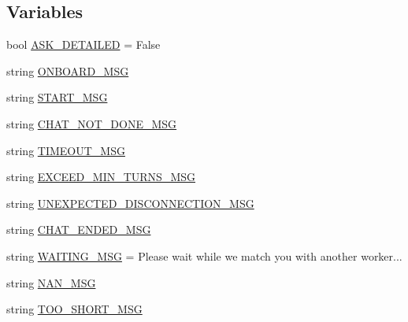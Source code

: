 \subsection*{Variables}
\begin{DoxyCompactItemize}
\item 
bool \hyperlink{namespaceprojects_1_1controllable__dialogue_1_1mturk_1_1worlds_ae8e21c5fc7585f72997c46673774e560}{A\+S\+K\+\_\+\+D\+E\+T\+A\+I\+L\+ED} = False
\item 
string \hyperlink{namespaceprojects_1_1controllable__dialogue_1_1mturk_1_1worlds_add971d800febe4ed1c8e6519f47b0344}{O\+N\+B\+O\+A\+R\+D\+\_\+\+M\+SG}
\item 
string \hyperlink{namespaceprojects_1_1controllable__dialogue_1_1mturk_1_1worlds_a8b6f4cadfbf4ded8be056b35fc39bfea}{S\+T\+A\+R\+T\+\_\+\+M\+SG}
\item 
string \hyperlink{namespaceprojects_1_1controllable__dialogue_1_1mturk_1_1worlds_a309caa0362b3ad2f21726ee5ac4695cf}{C\+H\+A\+T\+\_\+\+N\+O\+T\+\_\+\+D\+O\+N\+E\+\_\+\+M\+SG}
\item 
string \hyperlink{namespaceprojects_1_1controllable__dialogue_1_1mturk_1_1worlds_a0dbdd5f376e76791bb0860e586d1a198}{T\+I\+M\+E\+O\+U\+T\+\_\+\+M\+SG}
\item 
string \hyperlink{namespaceprojects_1_1controllable__dialogue_1_1mturk_1_1worlds_a0e771fa893e3b64e53f744b10c64a7b9}{E\+X\+C\+E\+E\+D\+\_\+\+M\+I\+N\+\_\+\+T\+U\+R\+N\+S\+\_\+\+M\+SG}
\item 
string \hyperlink{namespaceprojects_1_1controllable__dialogue_1_1mturk_1_1worlds_aff45fc3f19f338fe6b2c9cb99c6da1e8}{U\+N\+E\+X\+P\+E\+C\+T\+E\+D\+\_\+\+D\+I\+S\+C\+O\+N\+N\+E\+C\+T\+I\+O\+N\+\_\+\+M\+SG}
\item 
string \hyperlink{namespaceprojects_1_1controllable__dialogue_1_1mturk_1_1worlds_a12fd50caa99e1914f4344797a08d41ce}{C\+H\+A\+T\+\_\+\+E\+N\+D\+E\+D\+\_\+\+M\+SG}
\item 
string \hyperlink{namespaceprojects_1_1controllable__dialogue_1_1mturk_1_1worlds_ac94bf095d2c2e4d559363d64b22ca7e4}{W\+A\+I\+T\+I\+N\+G\+\_\+\+M\+SG} = \textquotesingle{}Please wait while we match you with another worker...\textquotesingle{}
\item 
string \hyperlink{namespaceprojects_1_1controllable__dialogue_1_1mturk_1_1worlds_ae7180eb404144ff9ddc65d0d7d9c3d3f}{N\+A\+N\+\_\+\+M\+SG}
\item 
string \hyperlink{namespaceprojects_1_1controllable__dialogue_1_1mturk_1_1worlds_a2b577d64088114bb8d4d2b96ae79db58}{T\+O\+O\+\_\+\+S\+H\+O\+R\+T\+\_\+\+M\+SG}

\end{DoxyCompactItemize}
